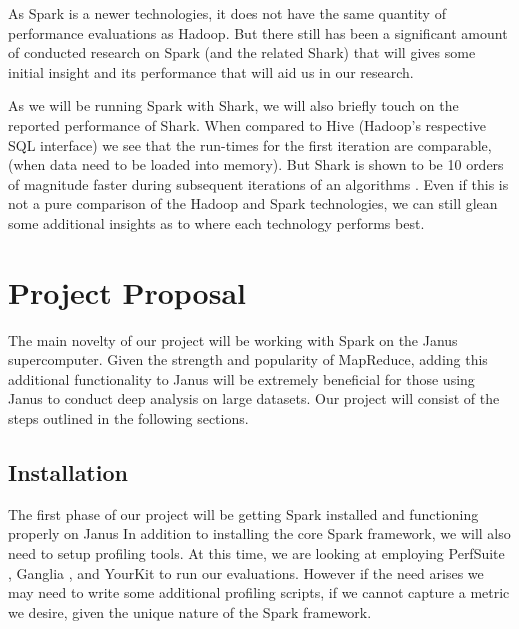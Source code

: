 \documentclass{article}
\begin{document}
As Spark is a newer technologies, it does not have the same quantity of
performance evaluations as Hadoop. But there still has been a significant
amount of conducted research on Spark (and the related Shark) that will gives
some initial insight and its performance that will aid us in our research.






As we will be running Spark with Shark, we will also briefly touch on the
reported performance of Shark. When compared to Hive (Hadoop's respective
SQL interface) we see that the run-times for the first iteration are comparable,
(when data need to be loaded into memory). But Shark is shown to be 10 orders
of magnitude faster during subsequent iterations of an algorithms \citep{engle}.
Even if this is not a pure comparison of the Hadoop and Spark technologies, we
can still glean some additional insights as to where each technology performs
best.


\section*{Project Proposal}
The main novelty of our project will be working with Spark on the Janus
supercomputer. Given the strength and popularity of MapReduce, adding this
additional functionality to Janus will be extremely beneficial for those using
Janus to conduct deep analysis on large datasets. Our project will consist of
the steps outlined in the following sections.

\subsection*{Installation}
The first phase of our project will be getting Spark installed and functioning
properly on Janus In addition to installing the core Spark framework, we will
also need to setup profiling tools. At this time, we are looking at employing
PerfSuite \citep{perfsuite}, Ganglia \citep{ganglia}, and YourKit
\citep{yourkit} to run our evaluations. However if the need arises we may
need to write some additional profiling scripts, if we cannot capture a metric
we desire, given the unique nature of the Spark framework.
\end{document}
